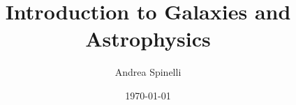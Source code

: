 \documentclass[a4paper,12pt]{report}
\institute{UniTs - University of Trieste}
\title{Introduction to Galaxies and Astrophysics}
\author{Andrea Spinelli}
\date{\today}
\begin{document}
\maketitle



\toc





\printbibliography
\end{document}

